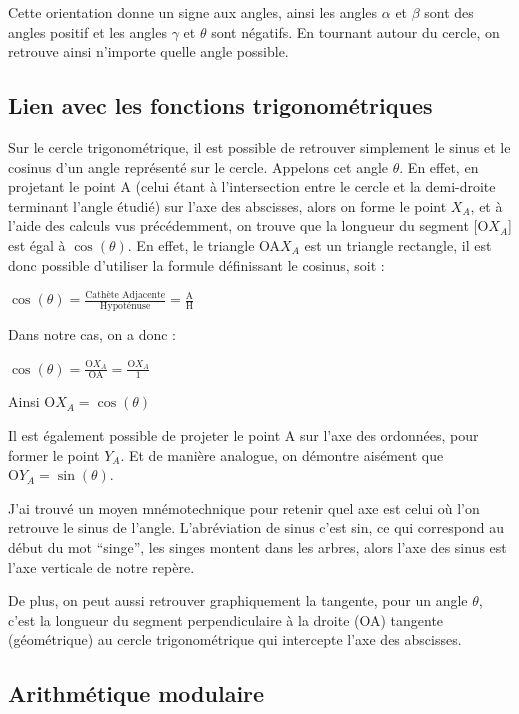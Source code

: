 \documentclass[a4paper]{article}
\begin{document}
			Cette orientation donne un signe aux angles, ainsi les angles $\alpha$ et $\beta$ sont des angles positif et les angles $\gamma$ et $\theta$ sont négatifs. En tournant autour du cercle, on retrouve ainsi n'importe quelle angle possible. 

		\subsection{Lien avec les fonctions trigonométriques}

			Sur le cercle trigonométrique, il est possible de retrouver simplement le sinus et le cosinus d'un angle représenté sur le cercle. Appelons cet angle $\theta$. En effet, en projetant le point A (celui étant à l'intersection entre le cercle et la demi-droite terminant l'angle étudié) sur l'axe des abscisses, alors on forme le point $X_A$, et à l'aide des calculs vus précédemment, on trouve que la longueur du segment [O$X_A$] est égal à $\cos(\theta)$. En effet, le triangle OA$X_A$ est un triangle rectangle, il est donc possible d'utiliser la formule définissant le cosinus, soit :

			$\cos(\theta) = \frac{\text{Cathète Adjacente}}{\text{Hypoténuse}} = \frac{\text{A}}{\text{H}}$

			Dans notre cas, on a donc :

			$\cos(\theta) = \frac{\text{O}X_A}{\text{OA}} = \frac{\text{O}X_A}{1}$

			Ainsi $\text{O}X_A = \cos(\theta)$

			Il est également possible de projeter le point A sur l'axe des ordonnées, pour former le point $Y_A$. Et de manière analogue, on démontre aisément que $\text{O}Y_A = \sin(\theta)$.

			J'ai trouvé un moyen mnémotechnique pour retenir quel axe est celui où l'on retrouve le sinus de l'angle. L'abréviation de sinus c'est sin, ce qui correspond au début du mot “singe”, les singes montent dans les arbres, alors l'axe des sinus est l'axe verticale de notre repère.

			De plus, on peut aussi retrouver graphiquement la tangente, pour un angle $\theta$, c'est la longueur du segment perpendiculaire à la droite (OA) tangente (géométrique) au cercle trigonométrique qui intercepte l'axe des abscisses.

		\subsection{Arithmétique modulaire}
\end{document}
